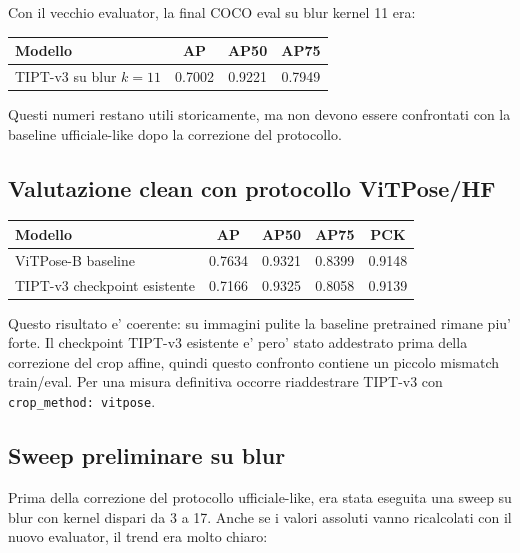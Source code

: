 \documentclass[11pt,a4paper]{article}
\newcommand{\code}[1]{\texttt{#1}}
\newcommand{\tipt}{TIPT-v3}
\newcommand{\vitpose}{ViTPose-B}
\begin{document}
Con il vecchio evaluator, la final COCO eval su blur kernel 11 era:

\begin{center}
\begin{tabular}{lccc}
\toprule
Modello & AP & AP50 & AP75 \\
\midrule
\tipt{} su blur $k=11$ & 0.7002 & 0.9221 & 0.7949 \\
\bottomrule
\end{tabular}
\end{center}

Questi numeri restano utili storicamente, ma non devono essere confrontati con
la baseline ufficiale-like dopo la correzione del protocollo.

\subsection{Valutazione clean con protocollo ViTPose/HF}

\begin{center}
\begin{tabular}{lcccc}
\toprule
Modello & AP & AP50 & AP75 & PCK \\
\midrule
\vitpose{} baseline & 0.7634 & 0.9321 & 0.8399 & 0.9148 \\
\tipt{} checkpoint esistente & 0.7166 & 0.9325 & 0.8058 & 0.9139 \\
\bottomrule
\end{tabular}
\end{center}

Questo risultato e' coerente: su immagini pulite la baseline pretrained rimane
piu' forte. Il checkpoint \tipt{} esistente e' pero' stato addestrato prima della
correzione del crop affine, quindi questo confronto contiene un piccolo mismatch
train/eval. Per una misura definitiva occorre riaddestrare \tipt{} con
\code{crop\_method: vitpose}.

\subsection{Sweep preliminare su blur}

Prima della correzione del protocollo ufficiale-like, era stata eseguita una
sweep su blur con kernel dispari da 3 a 17. Anche se i valori assoluti vanno
ricalcolati con il nuovo evaluator, il trend era molto chiaro:
\end{document}
